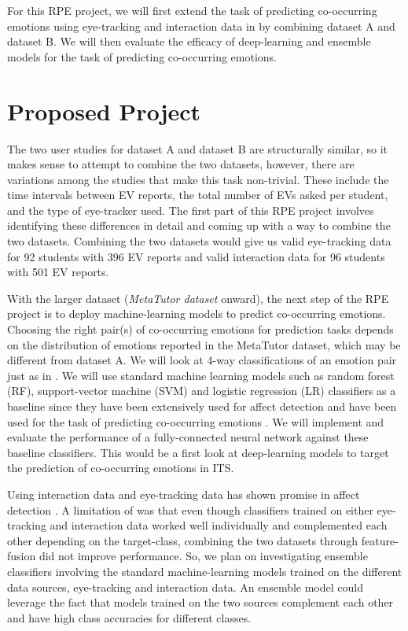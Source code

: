 \documentclass[10pt,letterpaper]{article}
\begin{document}
For this RPE project, we will first extend the task of predicting co-occurring emotions using eye-tracking and interaction data in \cite{lalle2021predict} by combining dataset A and dataset B. We will then evaluate the efficacy of deep-learning and ensemble models for the task of predicting co-occurring emotions.

\section{Proposed Project}

The two user studies for dataset A and dataset B are structurally similar, so it makes sense to attempt to combine the two datasets, however, there are variations among the studies that make this task non-trivial. These include the time intervals between EV reports, the total number of EVs asked per student, and the type of eye-tracker used. The first part of this RPE project involves identifying these differences in detail and coming up with a way to combine the two datasets. Combining the two datasets would give us valid eye-tracking data for 92 students with 396 EV reports and valid interaction data for 96 students with 501 EV reports.


With the larger dataset (\textit{MetaTutor dataset} onward), the next step of the RPE project is to deploy machine-learning models to predict co-occurring emotions. Choosing the right pair(s) of co-occurring emotions for prediction tasks depends on the distribution of emotions reported in the MetaTutor dataset, which may be different from dataset A. We will look at 4-way classifications of an emotion pair just as in \cite{lalle2021predict}. We will use standard machine learning models such as random forest (RF), support-vector machine (SVM) and logistic regression (LR) classifiers as a baseline since they have been extensively used for affect detection \autocite{zeng2008survey} and have been used for the task of predicting co-occurring emotions \autocite{lalle2021predict}. We will implement and evaluate the performance of a fully-connected neural network against these baseline classifiers. This would be a first look at deep-learning models to target the prediction of co-occurring emotions in ITS.

Using interaction data and eye-tracking data has shown promise in affect detection \autocite{lalle2016predicting, lalle2021predict}. A limitation of \autocite{lalle2021predict} was that even though classifiers trained on either eye-tracking and interaction data worked well individually and complemented each other depending on the target-class, combining the two datasets through feature-fusion did not improve performance. So, we plan on investigating ensemble classifiers involving the standard machine-learning models trained on the different data sources, eye-tracking and interaction data. An ensemble model could leverage the fact that models trained on the two sources complement each other and have high class accuracies for different classes.
\end{document}
